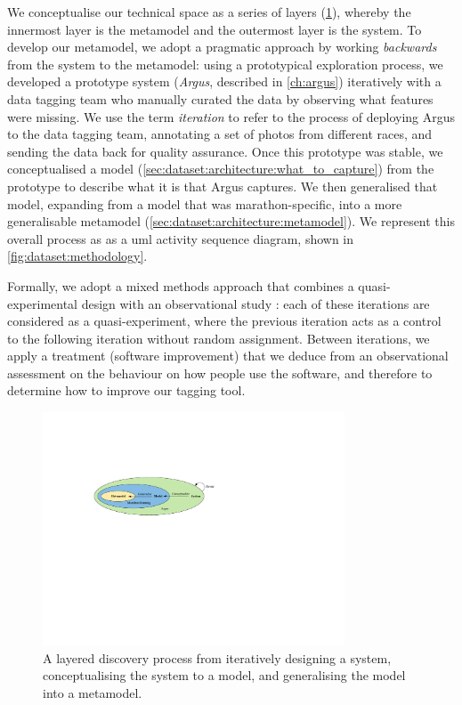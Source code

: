 We conceptualise our technical space as a series of layers (\cref{fig:dataset:layers}), whereby the innermost layer is the metamodel and the outermost layer is the system. To develop our metamodel, we adopt a pragmatic approach by working \textit{backwards} from the system to the metamodel: using a prototypical exploration process, we developed a prototype system (\textit{Argus}, described in \cref{ch:argus}) iteratively with a data tagging team who manually curated the data by observing what features were missing. We use the term \textit{iteration} to refer to the process of deploying Argus to the data tagging team, annotating a set of photos from different races, and sending the data back for quality assurance. Once this prototype was stable, we conceptualised a model (\cref{sec:dataset:architecture:what_to_capture}) from the prototype to describe what it is that Argus captures. We then generalised that model, expanding from a model that was marathon-specific, into a more generalisable metamodel (\cref{sec:dataset:architecture:metamodel}). We represent this overall process as as a \gls{uml} activity sequence diagram, shown in \cref{fig:dataset:methodology}.

Formally, we adopt a mixed methods approach that combines a quasi-experimental design with an observational study \citep{Trochim:2001wg,Gray:2013va}: each of these iterations are considered as a quasi-experiment, where the previous iteration acts as a control to the following iteration without random assignment. Between iterations, we apply a treatment (software improvement) that we deduce from an observational assessment on the behaviour on how people use the software, and therefore to determine how to improve our tagging tool.

\begin{figure}[h]
  \centering
  \includegraphics[width=0.8\textwidth]{images/dataset/layers}
  \caption[A layered approach to develop our metamodel]{A layered discovery process from iteratively designing a system, conceptualising the system to a model, and generalising the model into a metamodel.}
  \label{fig:dataset:layers}
\end{figure}

